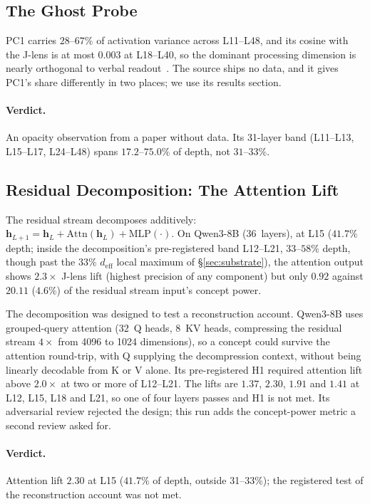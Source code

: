 \documentclass[11pt,a4paper]{article}
\begin{document}
\subsection{The Ghost Probe}
\label{sec:ghost}

PC1 carries $28$--$67\%$ of activation variance across L11--L48, and its
cosine with the J-lens is at most $0.003$ at L18--L40, so the dominant
processing dimension is nearly orthogonal to verbal
readout~\citep{lyra2026ghost}. The source ships no data, and it gives
PC1's share differently in two places; we use its results section.

\paragraph{Verdict.} An opacity observation from a paper without data.
Its 31-layer band (L11--L13, L15--L17, L24--L48) spans $17.2$--$75.0\%$ of depth, not $31$--$33\%$.

\subsection{Residual Decomposition: The Attention Lift}
\label{sec:decomp}
\label{sec:reconstruction}

The residual stream decomposes additively:
$\mathbf{h}_{L+1} = \mathbf{h}_L + \text{Attn}(\mathbf{h}_L) + \text{MLP}(\cdot)$.
On Qwen3-8B (36~layers), at L15 ($41.7\%$ depth; inside the
decomposition's pre-registered band L12--L21, $33$--$58\%$ depth, though
past the $33\%$ $d_\text{eff}$ local maximum of \S\ref{sec:substrate}),
the attention output shows $2.3\times$
J-lens lift (highest precision of any component) but only $0.92$ against $20.11$ ($4.6\%$) of
the residual stream input's concept power.

The decomposition was designed to test a reconstruction account. Qwen3-8B
uses grouped-query attention (32~Q heads, 8~KV heads, compressing the
residual stream $4\times$ from 4096 to 1024 dimensions), so a concept
could survive the attention round-trip, with Q supplying the
decompression context, without being linearly decodable from K or V
alone. Its pre-registered H1 required attention lift above $2.0\times$
at two or more of L12--L21. The lifts are $1.37$, $2.30$, $1.91$ and $1.41$ at L12, L15, L18 and L21, so one of four layers passes and H1 is not met. Its
adversarial review rejected the design; this run adds the concept-power
metric a second review asked for.

\paragraph{Verdict.} Attention lift $2.30$ at L15 ($41.7\%$ of depth, outside 31--33\%); the
registered test of the reconstruction account was not met.
\end{document}
